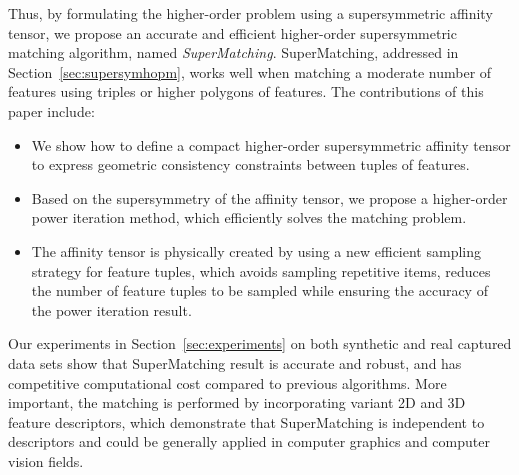 Thus, by formulating the higher-order problem using a supersymmetric affinity tensor,
we propose an accurate and efficient higher-order supersymmetric matching algorithm, named \emph{SuperMatching}.
SuperMatching, addressed in Section~\ref{sec:supersymhopm}, works well when matching a moderate number of features using triples or higher polygons of features.
The contributions of this paper include:
\begin{itemize}
\item We show how to define a compact higher-order supersymmetric affinity tensor to express geometric consistency constraints between tuples of features.

\item Based on the supersymmetry of the affinity tensor, we propose a higher-order power iteration method, which efficiently solves the matching problem.

\item The affinity tensor is physically created by using a new efficient sampling strategy for feature tuples,
which avoids sampling repetitive items, reduces the number of feature tuples to be sampled while ensuring the accuracy of the power iteration result.

\end{itemize}

Our experiments in Section~\ref{sec:experiments} on both synthetic and real captured data sets show that SuperMatching result is accurate and robust,
and has competitive computational cost compared to previous algorithms.
More important, the matching is performed by incorporating variant 2D and 3D feature descriptors,
which demonstrate that SuperMatching is independent to descriptors and could be generally applied in computer graphics and computer vision fields.

